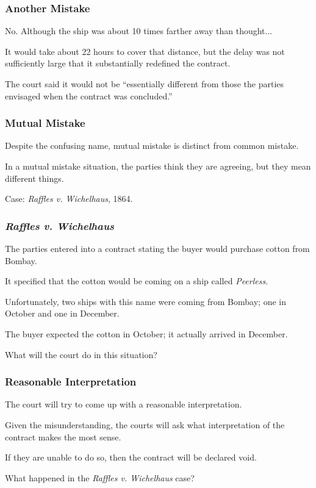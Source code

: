 \begin{frame}
\frametitle{Another Mistake}

No. Although the ship was about 10 times farther away than thought...

It would take about 22 hours to cover that distance, but the delay was not sufficiently large that it substantially redefined the contract.

The court said it would not be ``essentially different from those the parties envisaged when the contract was concluded.''


\end{frame}



\begin{frame}
\frametitle{Mutual Mistake}

Despite the confusing name, mutual mistake is distinct from common mistake.

In a mutual mistake situation, the parties think they are agreeing, but they mean different things. 

Case: \textit{Raffles v. Wichelhaus}, 1864.

\end{frame}




\begin{frame}
\frametitle{\textit{Raffles v. Wichelhaus}}

The parties entered into a contract stating the buyer would purchase cotton from Bombay.

It specified that the cotton would be coming on a ship called \textit{Peerless}.

Unfortunately, two ships with this name were coming from Bombay; one in October and one in December.

The buyer expected the cotton in October; it actually arrived in December.

What will the court do in this situation?

\end{frame}



\begin{frame}
\frametitle{Reasonable Interpretation}

The court will try to come up with a reasonable interpretation.

Given the misunderstanding, the courts will ask what interpretation of the contract makes the most sense.

If they are unable to do so, then the contract will be declared void.

What happened in the \textit{Raffles v. Wichelhaus} case?

\end{frame}



